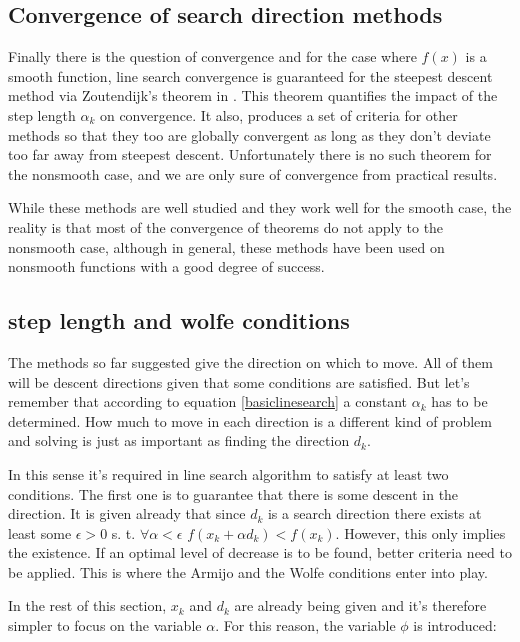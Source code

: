 \subsection{Convergence of search direction methods}

Finally there is the question of convergence and for the case where $f(x)$ is a smooth function, line search convergence is guaranteed for the steepest descent method via Zoutendijk's theorem \citep{zoutendijk} in \citep{Abadie}.  This theorem quantifies the impact of the step length $\alpha_k$ on convergence.  It also, produces a set of criteria for other methods so that they too are globally convergent as long as they don't deviate too far away from steepest descent. Unfortunately there is no such theorem for the nonsmooth case, and we are only sure of convergence from practical results.

While these methods are well studied and they work well for the smooth case, the reality is that most of the convergence of theorems do not apply to the nonsmooth case, although in general, these methods have been used on nonsmooth functions with a good degree of success\citep{skaaja}.

\subsection{step length and wolfe conditions}

The methods so far suggested give the direction on which to move.  All of them will be descent directions given that some conditions are satisfied.  But let's remember that according to equation \ref{basiclinesearch} a constant $\alpha_k$ has to be determined.  How much to move in each direction is a different kind of problem and solving is just as important as finding the direction $d_k$.

In this sense it's required in line search algorithm to satisfy at least two conditions.  The first one is to guarantee that there is some descent in the direction.  It is given already that since $d_k$ is a search direction there exists at least some $\epsilon > 0$ s. t. $\forall \alpha < \epsilon$ $f(x_k + \alpha d_k) < f(x_k)$.  However, this only implies the existence.  If an optimal level of decrease is to be found, better criteria need to be applied.  This is where the Armijo and the Wolfe conditions enter into play.

In the rest of this section, $x_k$ and $d_k$ are already being given and it's therefore simpler to focus on the variable $\alpha$.  For this reason, the variable $\phi$ is introduced:

